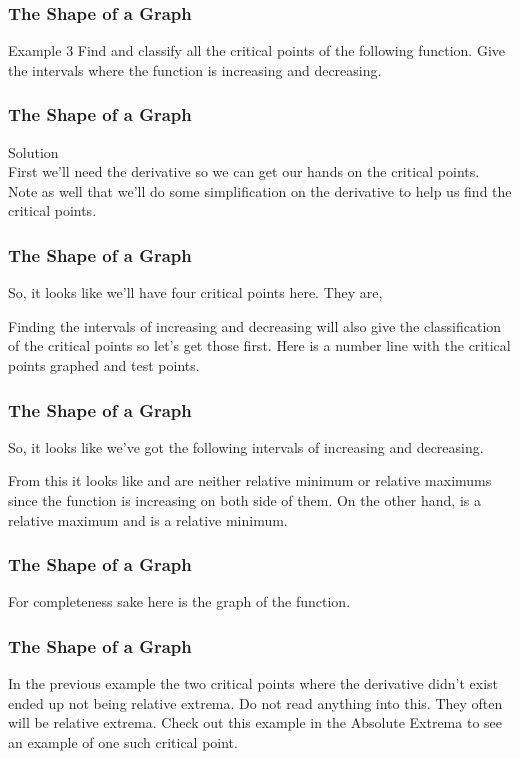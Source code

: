 \documentclass{beamer}
\begin{document}
\begin{frame} 
	\frametitle{The Shape of a Graph}

Example 3  Find and classify all the critical points of the following function.  Give the intervals where the function is increasing and decreasing.
\end{frame}
\begin{frame} 
	\frametitle{The Shape of a Graph}
Solution\\
First we’ll need the derivative so we can get our hands on the critical points.  Note as well that we’ll do some simplification on the derivative to help us find the critical points.

\end{frame}
\begin{frame} 
	\frametitle{The Shape of a Graph}
So, it looks like we’ll have four critical points here.  They are,


Finding the intervals of increasing and decreasing will also give the classification of the critical points so let’s get those first.  Here is a number line with the critical points graphed and test points.
\end{frame}
\begin{frame} 
	\frametitle{The Shape of a Graph}

So, it looks like we’ve got the following intervals of increasing and decreasing.


From this it looks like  and  are neither relative minimum or relative maximums since the function is increasing on both side of them.  On the other hand,  is a relative maximum and  is a relative minimum.
\end{frame}
\begin{frame} 
	\frametitle{The Shape of a Graph}
For completeness sake here is the graph of the function.
\end{frame}
\begin{frame} 
	\frametitle{The Shape of a Graph}
In the previous example the two critical points where the derivative didn’t exist ended up not being relative extrema.  Do not read anything into this.  They often will be relative extrema.  Check out this example in the Absolute Extrema to see an example of one such critical point.
\end{frame}
\end{document}
